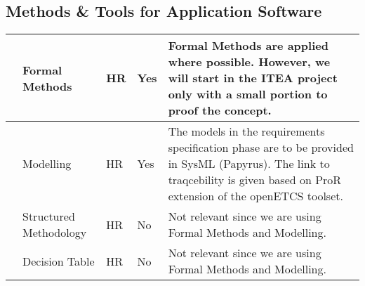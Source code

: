 \documentclass{template/openetcs_article}
\begin{document}
\newpage
\begin{appendices}
\section{Methods \& Tools for Application Software}
\label{ref:MethodS}

\begin{table}[H]


\begin{supertabular}[H]{|p{1cm}|p{5cm}|p{1cm}|p{2cm}|p{5cm}|}
\hline
{} &
Formal Methods &
\centering
HR &
\centering
Yes &
Formal Methods are applied where possible. However, we will start in the ITEA project only with a small portion to proof the concept. \\\hline
{} &
Modelling &
\centering
HR &
\centering
Yes &
The models in the requirements specification phase are to be provided in SysML (Papyrus). The link to traqcebility is given based on ProR extension of the openETCS toolset.
\\\hline
{} &
Structured Methodology &
\centering
HR &
\centering
No &
Not relevant since we are using Formal Methods and Modelling.
\\\hline
{} &
Decision Table &
\centering
HR &
\centering
No &
Not relevant since we are using Formal Methods and Modelling.
\\\hline


\end{supertabular}
\end{table}
\end{appendices}
\end{document}
